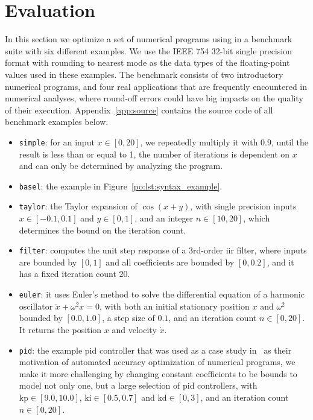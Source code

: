 \section{Evaluation}
\label{po:sec:results}


In this section we optimize a set of numerical programs using \soap{} in a
benchmark suite with six different examples.  We use the IEEE 754 32-bit
single precision format with rounding to nearest mode as the data types of the
floating-point values used in these examples.  The benchmark consists of two
introductory numerical programs, and four real applications that are frequently
encountered in numerical analyses, where round-off errors could have big
impacts on the quality of their execution.  Appendix~\ref{app:source} contains
the source code of all benchmark examples below.
\begin{itemize}

    \item \texttt{simple}: for an input $x \in [0, 20]$, we repeatedly multiply
    it with $0.9$, until the result is less than or equal to 1, the number of
    iterations is dependent on $x$ and can only be determined by analyzing the
    program.

    \item \texttt{basel}: the example in Figure~\ref{po:lst:syntax_example}.

    \item \texttt{taylor}: the Taylor expansion of $\cos(x + y)$, with single
    precision inputs $x \in [-0.1, 0.1]$ and $y \in [0, 1]$, and an integer $n
    \in [10, 20]$, which determines the bound on the iteration count.

    \item \texttt{filter}: computes the unit step response of a 3rd-order
    \gls{iir} filter, where inputs are bounded by $[0, 1]$ and all coefficients
    are bounded by $[0, 0.2]$, and it has a fixed iteration count $20$.

    \item \texttt{euler}: it uses Euler's method to solve the differential
    equation of a harmonic oscillator $\ddot{x} + \omega^2 x = 0$, with both an
    initial stationary position $x$ and $\omega^2$ bounded by $[0.0, 1.0]$, a
    step size of $0.1$, and an iteration count $n \in [0, 20]$.  It returns the
    position $x$ and velocity $\dot{x}$.

    \item \texttt{pid}: the example \gls{pid} controller that was used as a
    case study in~\cite{damouche14} as their motivation of automated accuracy
    optimization of numerical programs, we make it more challenging by changing
    constant coefficients to be bounds to model not only one, but a large
    selection of \gls{pid} controllers, with $\mathrm{kp} \in [9.0, 10.0]$,
    $\mathrm{ki} \in [0.5, 0.7]$ and $\mathrm{kd} \in [0, 3]$, and an iteration
    count $n \in [0, 20]$.

\end{itemize}

